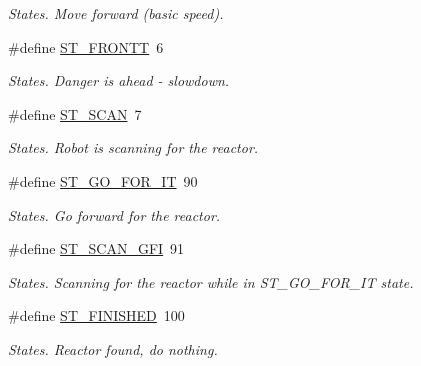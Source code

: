 \begin{DoxyCompactItemize}
\begin{DoxyCompactList}\small\item\em States. Move forward (basic speed). \item\end{DoxyCompactList}\item 
\hypertarget{reactor_8nxc_a82671cbfd87d61e73ed46e39a25ea515}{
\#define \hyperlink{reactor_8nxc_a82671cbfd87d61e73ed46e39a25ea515}{ST\_\-FRONTT}~6}
\label{reactor_8nxc_a82671cbfd87d61e73ed46e39a25ea515}

\begin{DoxyCompactList}\small\item\em States. Danger is ahead -\/ slowdown. \item\end{DoxyCompactList}\item 
\hypertarget{reactor_8nxc_a3744009c444a7b62295fa027e1f42a15}{
\#define \hyperlink{reactor_8nxc_a3744009c444a7b62295fa027e1f42a15}{ST\_\-SCAN}~7}
\label{reactor_8nxc_a3744009c444a7b62295fa027e1f42a15}

\begin{DoxyCompactList}\small\item\em States. Robot is scanning for the reactor. \item\end{DoxyCompactList}\item 
\hypertarget{reactor_8nxc_af8e9dc0efb6c5ba062bc1fdace7300be}{
\#define \hyperlink{reactor_8nxc_af8e9dc0efb6c5ba062bc1fdace7300be}{ST\_\-GO\_\-FOR\_\-IT}~90}
\label{reactor_8nxc_af8e9dc0efb6c5ba062bc1fdace7300be}

\begin{DoxyCompactList}\small\item\em States. Go forward for the reactor. \item\end{DoxyCompactList}\item 
\hypertarget{reactor_8nxc_a01eb7829648bea6bf8eaa82af9dacddb}{
\#define \hyperlink{reactor_8nxc_a01eb7829648bea6bf8eaa82af9dacddb}{ST\_\-SCAN\_\-GFI}~91}
\label{reactor_8nxc_a01eb7829648bea6bf8eaa82af9dacddb}

\begin{DoxyCompactList}\small\item\em States. Scanning for the reactor while in ST\_\-GO\_\-FOR\_\-IT state. \item\end{DoxyCompactList}\item 
\hypertarget{reactor_8nxc_a1c7e6cd43336e10d60f8c0635e8b7734}{
\#define \hyperlink{reactor_8nxc_a1c7e6cd43336e10d60f8c0635e8b7734}{ST\_\-FINISHED}~100}
\label{reactor_8nxc_a1c7e6cd43336e10d60f8c0635e8b7734}

\begin{DoxyCompactList}\small\item\em States. Reactor found, do nothing. \item\end{DoxyCompactList}\end{DoxyCompactItemize}
